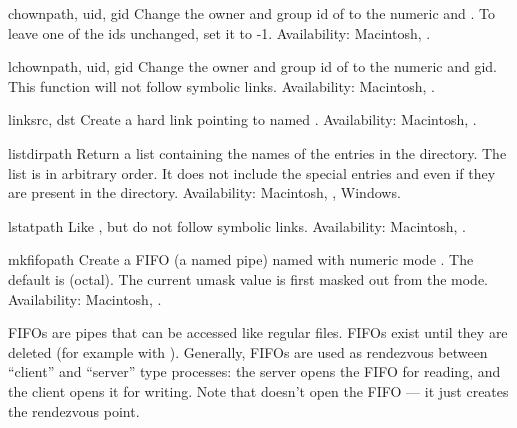 \begin{funcdesc}{chown}{path, uid, gid}
Change the owner and group id of  to the numeric 
and . To leave one of the ids unchanged, set it to -1.
Availability: Macintosh, \UNIX.
\end{funcdesc}

\begin{funcdesc}{lchown}{path, uid, gid}
Change the owner and group id of  to the numeric 
and gid. This function will not follow symbolic links.
Availability: Macintosh, \UNIX.
\end{funcdesc}

\begin{funcdesc}{link}{src, dst}
Create a hard link pointing to  named .
Availability: Macintosh, \UNIX.
\end{funcdesc}

\begin{funcdesc}{listdir}{path}
Return a list containing the names of the entries in the directory.
The list is in arbitrary order.  It does not include the special
entries  and  even if they are present in the
directory.
Availability: Macintosh, \UNIX, Windows.

\end{funcdesc}

\begin{funcdesc}{lstat}{path}
Like , but do not follow symbolic links.
Availability: Macintosh, \UNIX.
\end{funcdesc}

\begin{funcdesc}{mkfifo}{path}
Create a FIFO (a named pipe) named  with numeric mode
.  The default  is  (octal).  The current
umask value is first masked out from the mode.
Availability: Macintosh, \UNIX.

FIFOs are pipes that can be accessed like regular files.  FIFOs exist
until they are deleted (for example with ).
Generally, FIFOs are used as rendezvous between ``client'' and
``server'' type processes: the server opens the FIFO for reading, and
the client opens it for writing.  Note that 
doesn't open the FIFO --- it just creates the rendezvous point.
\end{funcdesc}

